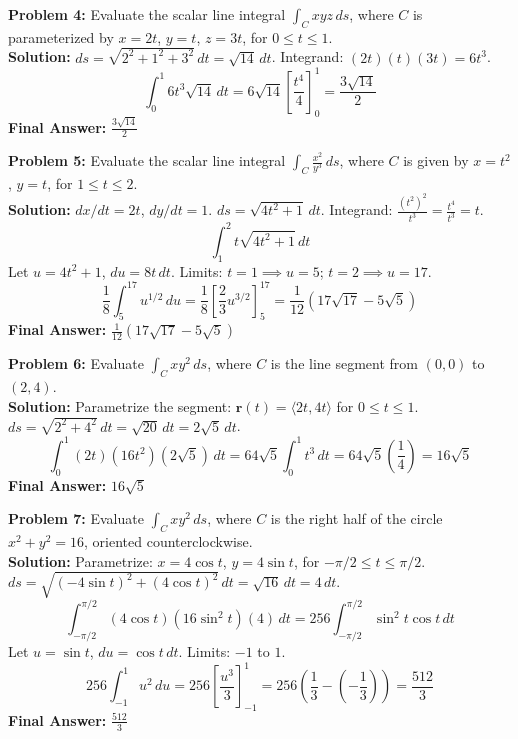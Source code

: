 \documentclass[11pt]{article}
\begin{document}
\textbf{Problem 4:} Evaluate the scalar line integral $\int_C xyz \,ds$, where $C$ is parameterized by $x = 2t$, $y = t$, $z = 3t$, for $0 \le t \le 1$.
\\
\textbf{Solution:} $ds = \sqrt{2^2 + 1^2 + 3^2} \,dt = \sqrt{14} \,dt$.
Integrand: $(2t)(t)(3t) = 6t^3$.
$$ \int_0^1 6t^3\sqrt{14} \,dt = 6\sqrt{14} \left[ \frac{t^4}{4} \right]_0^1 = \frac{3\sqrt{14}}{2} $$
\textbf{Final Answer:} $\frac{3\sqrt{14}}{2}$
\vspace{0.5cm}

\textbf{Problem 5:} Evaluate the scalar line integral $\int_C \frac{x^2}{y^3} \,ds$, where $C$ is given by $x = t^2$, $y = t$, for $1 \le t \le 2$.
\\
\textbf{Solution:} $dx/dt = 2t$, $dy/dt = 1$. $ds = \sqrt{4t^2 + 1} \,dt$.
Integrand: $\frac{(t^2)^2}{t^3} = \frac{t^4}{t^3} = t$.
$$ \int_1^2 t\sqrt{4t^2 + 1} \,dt $$
Let $u = 4t^2 + 1$, $du = 8t \,dt$. Limits: $t=1 \implies u=5$; $t=2 \implies u=17$.
$$ \frac{1}{8} \int_5^{17} u^{1/2} \,du = \frac{1}{8} \left[ \frac{2}{3}u^{3/2} \right]_5^{17} = \frac{1}{12}(17\sqrt{17} - 5\sqrt{5}) $$
\textbf{Final Answer:} $\frac{1}{12}(17\sqrt{17} - 5\sqrt{5})$
\vspace{0.5cm}

\textbf{Problem 6:} Evaluate $\int_C xy^2 \,ds$, where $C$ is the line segment from $(0,0)$ to $(2,4)$.
\\
\textbf{Solution:} Parametrize the segment: $\mathbf{r}(t) = \langle 2t, 4t \rangle$ for $0 \le t \le 1$.
$ds = \sqrt{2^2 + 4^2} \,dt = \sqrt{20} \,dt = 2\sqrt{5} \,dt$.
$$ \int_0^1 (2t)(16t^2)(2\sqrt{5}) \,dt = 64\sqrt{5} \int_0^1 t^3 \,dt = 64\sqrt{5} \left( \frac{1}{4} \right) = 16\sqrt{5} $$
\textbf{Final Answer:} $16\sqrt{5}$
\vspace{0.5cm}

\textbf{Problem 7:} Evaluate $\int_C xy^2 \,ds$, where $C$ is the right half of the circle $x^2 + y^2 = 16$, oriented counterclockwise.
\\
\textbf{Solution:} Parametrize: $x = 4\cos t$, $y = 4\sin t$, for $-\pi/2 \le t \le \pi/2$.
$ds = \sqrt{(-4\sin t)^2 + (4\cos t)^2} \,dt = \sqrt{16} \,dt = 4 \,dt$.
$$ \int_{-\pi/2}^{\pi/2} (4\cos t)(16\sin^2 t)(4) \,dt = 256 \int_{-\pi/2}^{\pi/2} \sin^2 t \cos t \,dt $$
Let $u = \sin t$, $du = \cos t \,dt$. Limits: $-1$ to $1$.
$$ 256 \int_{-1}^1 u^2 \,du = 256 \left[ \frac{u^3}{3} \right]_{-1}^1 = 256 \left( \frac{1}{3} - \left(-\frac{1}{3}\right) \right) = \frac{512}{3} $$
\textbf{Final Answer:} $\frac{512}{3}$
\vspace{0.5cm}
\end{document}
